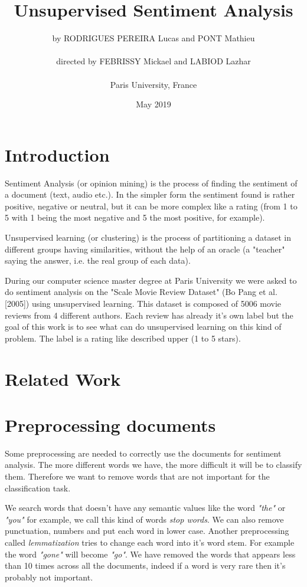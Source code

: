 \documentclass{article}
\title{Unsupervised Sentiment Analysis}
\author{by RODRIGUES PEREIRA Lucas and PONT Mathieu\\\\directed by FEBRISSY Mickael and LABIOD Lazhar\\\\Paris University, France}
\date{May 2019}
\begin{document}
\maketitle




\section{Introduction}

Sentiment Analysis (or opinion mining) is the process of finding the sentiment of a document (text, audio etc.). In the simpler form the sentiment found is rather positive, negative or neutral, but it can be more complex like a rating (from 1 to 5 with 1 being the most negative and 5 the most positive, for example).

Unsupervised learning (or clustering) is the process of partitioning a dataset in different groups having similarities, without the help of an oracle (a "teacher" saying the answer, i.e. the real group of each data).

During our computer science master degree at Paris University we were asked
to do sentiment analysis on the "Scale Movie Review Dataset" (Bo Pang et al. [2005]) using unsupervised learning. This dataset is composed of 5006 movie reviews from 4 different authors. Each review has already it's own label but the goal of this work is to see what can do unsupervised learning on this kind of problem. The label is a rating like described upper (1 to 5 stars).



\section{Related Work}



\section{Preprocessing documents}

Some preprocessing are needed to correctly use the documents for sentiment analysis. The more different words we have, the more difficult it will be to classify them. Therefore we want to remove words that are not important for the classification task. 

We search words that doesn't have any semantic values like the word \textit{"the"} or \textit{"you"} for example, we call this kind of words \textit{stop words}. We can also remove punctuation, numbers and put each word in lower case. Another preprocessing called \textit{lemmatization} tries to change each word into it's word stem. For example the word \textit{"gone"} will become \textit{"go"}. We have removed the words that appears less than 10 times across all the documents, indeed if a word is very rare then it's probably not important.
\end{document}
